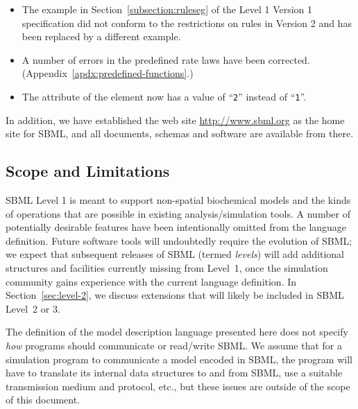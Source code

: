 \documentclass[10pt]{cekarticle}
\newcommand{\changed}[1]{\textcolor{BrickRed}{#1}}
\newenvironment{blockChanged}{\color{BrickRed}}{}
\begin{document}
\begin{blockChanged}
\begin{itemize}
\item The example in Section~\ref{subsection:ruleseg} of the Level 1
  Version 1 specification did not conform to the restrictions on rules in
  Version 2 and has been replaced by a different example.

\item A number of errors in the predefined rate laws have been corrected.
  (Appendix~\ref{apdx:predefined-functions}.)

\item The  attribute of the  element now has a
  value of ``\texttt{2}'' instead of ``\texttt{1}''.
  
\end{itemize}

In addition, we have established the web site \url{http://www.sbml.org} as
the home site for SBML, and all documents, schemas and software are
available from there.

\end{blockChanged}


\subsection{Scope and Limitations}

SBML Level 1 is meant to support non-spatial biochemical models and the
kinds of operations that are possible in existing analysis/simulation
tools.  A number of potentially desirable features have been intentionally
omitted from the language definition.  Future software tools will
undoubtedly require the evolution of SBML; we expect that subsequent
releases of SBML (termed \emph{levels}) will add additional structures and
facilities currently missing from Level~1, once the simulation community
gains experience with the current language definition.  In
Section~\ref{sec:level-2}, we discuss extensions that will likely be
included in SBML Level~2 \changed{or 3}.

The definition of the model description language presented here does not
specify \emph{how} programs should communicate or read/write SBML.  We
assume that for a simulation program to communicate a model encoded in
SBML, the program will have to translate its internal data structures to
and from SBML, use a suitable transmission medium and protocol, etc., but
these issues are outside of the scope of this document.
\end{document}
